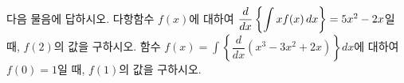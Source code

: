 다음 물음에 답하시오.
 다항함수 $f(x)$에 대하여 $\dfrac{d}{dx}\left\{\displaystyle\int xf(x)\mkern3mu dx\right\}=5x^2-2x$일 때, $f(2)$의 값을 구하시오.
 함수 $f(x)=\displaystyle\int \left\{\dfrac{d}{dx}(x^3-3x^2+2x)\right\}dx$에 대하여 $f(0)=1$일 때, $f(1)$의 값을 구하시오.
